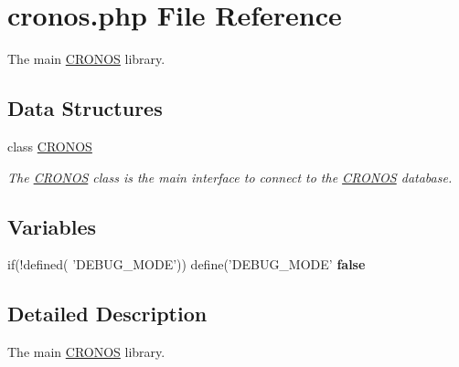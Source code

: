 \hypertarget{cronos_8php}{
\section{cronos.php \-File \-Reference}
\label{cronos_8php}
}


\-The main \hyperlink{class_c_r_o_n_o_s}{\-C\-R\-O\-N\-O\-S} library.  


\subsection*{\-Data \-Structures}
\begin{DoxyCompactItemize}
\item 
class \hyperlink{class_c_r_o_n_o_s}{\-C\-R\-O\-N\-O\-S}
\begin{DoxyCompactList}\small\item\em \-The \hyperlink{class_c_r_o_n_o_s}{\-C\-R\-O\-N\-O\-S} class is the main interface to connect to the \hyperlink{class_c_r_o_n_o_s}{\-C\-R\-O\-N\-O\-S} database. \end{DoxyCompactList}\end{DoxyCompactItemize}
\subsection*{\-Variables}
\begin{DoxyCompactItemize}
\item 
\hypertarget{cronos_8php_afebbeab73ed8b5958539218e11762168}{
if(!defined( '\-D\-E\-B\-U\-G\-\_\-\-M\-O\-D\-E')) \*
define('\-D\-E\-B\-U\-G\-\_\-\-M\-O\-D\-E' {\bfseries false}}
\label{cronos_8php_afebbeab73ed8b5958539218e11762168}

\end{DoxyCompactItemize}


\subsection{\-Detailed \-Description}
\-The main \hyperlink{class_c_r_o_n_o_s}{\-C\-R\-O\-N\-O\-S} library. 